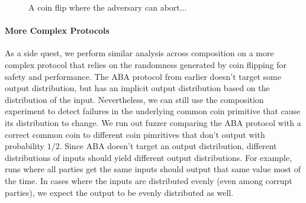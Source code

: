 
\begin{figure}
\centering

\caption{A coin flip where the adversary can abort...}
\label{fig:fcoinabort}
\end{figure}

\paragraph{More Complex Protocols}
As a side quest, we perform similar analysis across composition on a more complex protocol that relies on the randomness generated by coin flipping for safety and performance.
The ABA protocol from earlier doesn't target some output distribution, but has an implicit output distribution based on the distribution of the input.
Nevertheless, we can still use the composition experiment to detect failures in the underlying common coin primitive that cause its distribution to change.
We run out fuzzer comparing the ABA protocol with a correct common coin to different coin pimritives that don't output with probability $1/2$.
Since ABA doesn't target an output distribution, different distributions of inputs should yield different output distributions. 
For example, runs where all parties get the same inputs should output that same value most of the time.
In cases where the inputs are distributed evenly (even among corrupt parties), we expect the output to be evenly distributed as well.


\begin{figure*}
\centering

\end{figure*}


